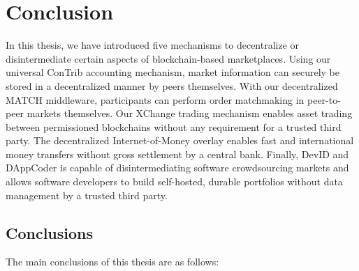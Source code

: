 \chapter{Conclusion}
\label{conclusion}

In this thesis, we have introduced five mechanisms to decentralize or disintermediate certain aspects of blockchain-based marketplaces.
Using our universal ConTrib accounting mechanism, market information can securely be stored in a decentralized manner by peers themselves.
With our decentralized MATCH middleware, participants can perform order matchmaking in peer-to-peer markets themselves.
Our XChange trading mechanism enables asset trading between permissioned blockchains without any requirement for a trusted third party.
The decentralized Internet-of-Money overlay enables fast and international money transfers without gross settlement by a central bank.
Finally, DevID and DAppCoder is capable of disintermediating software crowdsourcing markets and allows software developers to build self-hosted, durable portfolios without data management by a trusted third party.

\section{Conclusions}
The main conclusions of this thesis are as follows:


